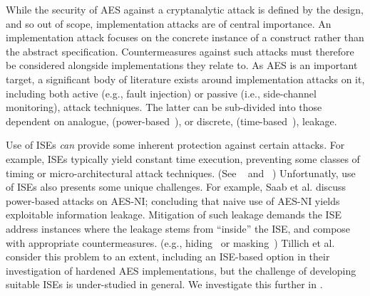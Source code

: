 
While the security of AES against a cryptanalytic attack is defined by
the design, and so out of scope, implementation attacks are
of central importance.
An implementation attack focuses on the concrete instance of a construct
rather than the abstract specification.
Countermeasures against such attacks must therefore be
considered alongside implementations they relate to.
As AES is an important target, a significant body of literature exists
around implementation attacks on it, including both
 active (e.g., fault injection)
or
passive (i.e., side-channel monitoring),
attack techniques.
The latter can be sub-divided into those dependent on
analogue,
(power-based~\cite{ManOswPop:07}),
or
discrete, 
(time-based~\cite{KoeQui:99}),
leakage.

Use of ISEs
{\em can} provide some inherent protection against certain attacks.
For example,
ISEs typically yield constant time execution,
preventing some classes of timing or micro-architectural
attack techniques.
(See ~\cite[Section 4]{Szefer:19} and ~\cite[Section 4]{GYCH:18})
Unfortunatly,
use of ISEs also presents some unique challenges.
For example, 
Saab et al.\cite{SaaRohHam:16}
discuss power-based attacks on AES-NI; concluding
that naive use of AES-NI yields exploitable information leakage.
Mitigation of such leakage demands the ISE
address instances where the leakage stems from ``inside'' the ISE,
and compose with appropriate countermeasures.
   (e.g., hiding~\cite[Chapter 7]{ManOswPop:07} or masking~\cite[Chapter 10]{ManOswPop:07})
Tillich et al.~\cite{TilHerMan:07}
consider this problem to an extent, including an ISE-based option in
their investigation of hardened AES implementations, but the challenge
of developing suitable ISEs is under-studied in general.
We investigate this further in .

